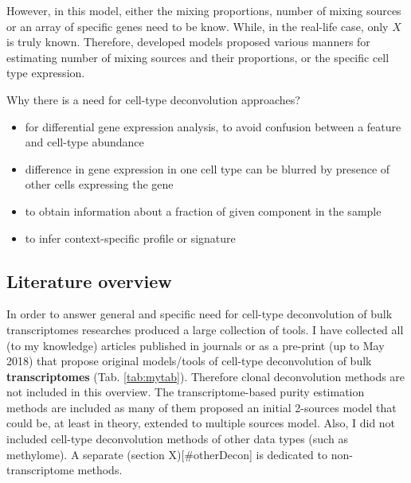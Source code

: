 \documentclass[12pt,]{book}
\theoremstyle{definition}
\theoremstyle{definition}
\theoremstyle{definition}
\theoremstyle{remark}
\begin{document}
However, in this model, either the mixing proportions, number of mixing
sources or an array of specific genes need to be know. While, in the
real-life case, only \(X\) is truly known. Therefore, developed models
proposed various manners for estimating number of mixing sources and
their proportions, or the specific cell type expression.

Why there is a need for cell-type deconvolution approaches?

\begin{itemize}
\item
  for differential gene expression analysis, to avoid confusion between
  a feature and cell-type abundance
\item
  difference in gene expression in one cell type can be blurred by
  presence of other cells expressing the gene
\item
  to obtain information about a fraction of given component in the
  sample
\item
  to infer context-specific profile or signature
\end{itemize}

\hypertarget{literature-overview}{%
\subsection{Literature overview}\label{literature-overview}}

In order to answer general and specific need for cell-type deconvolution
of bulk transcriptomes researches produced a large collection of tools.
I have collected all (to my knowledge) articles published in journals or
as a pre-print (up to May 2018) that propose original models/tools of
cell-type deconvolution of bulk \textbf{transcriptomes} (Tab.
\ref{tab:mytab}). Therefore clonal deconvolution methods are not
included in this overview. The transcriptome-based purity estimation
methods are included as many of them proposed an initial 2-sources model
that could be, at least in theory, extended to multiple sources model.
Also, I did not included cell-type deconvolution methods of other data
types (such as methylome). A separate (section X){[}\#otherDecon{]} is
dedicated to non-transcriptome methods.
\end{document}

